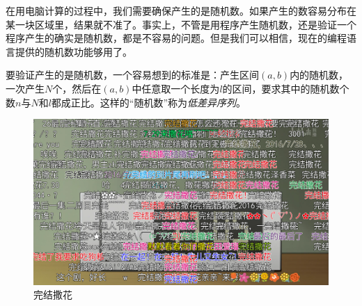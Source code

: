 在用电脑计算的过程中，我们需要确保产生的是随机数。如果产生的数容易分布在某一块区域里，结果就不准了。事实上，不管是用程序产生随机数，还是验证一个程序产生的确实是随机数，都是不容易的问题。但是我们可以相信，现在的编程语言提供的随机数功能够用了。

要验证产生的是随机数，一个容易想到的标准是：产生区间$(a,b)$内的随机数，一次产生$N$个，然后在$(a,b)$中任意取一个长度为$l$的区间，要求其中的随机数个数$n$与$N$和$l$都成正比。这样的“随机数”称为\emph{低差异序列}。
\vfill
\begin{figure}[htb]
\centering
\includegraphics[width=\textwidth]{fig/final-flower}
\caption{完结撒花}
\label{fig-final-flower}
\end{figure}
\vfill
